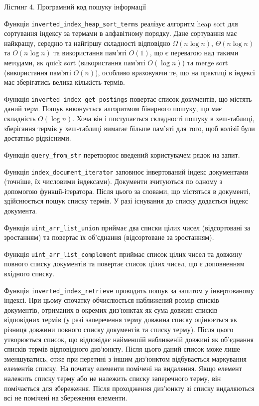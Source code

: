 \documentclass{../../templates/information_retrieval_lab}
\begin{document}
Лістинг 4. Програмний код пошуку інформації



Функція \texttt{inverted\_index\_heap\_sort\_terms} реалізує алгоритм heap sort для сортування індексу за термами в алфавітному порядку. Дане сортування має найкращу, середню та найгіршу складності відповідно $\Omega(n\log n)$, $\Theta(n\log n)$ та $O(n\log n)$ та використання пам'яті $O(1)$, що є перевагою над такими методами, як quick sort (використання пам'яті $O(\log n)$) та merge sort (використання пам'яті $O(n)$), особливо враховуючи те, що на практиці в індексі має зберігатись велика кількість термів.

Функція \texttt{inverted\_index\_get\_postings} повертає список документів, що містять даний терм. Пошук виконується алгоритмом бінарного пошуку, що має складність $O(\log n)$. Хоча він і поступається складності пошуку в хеш-таблиці, зберігання термів у хеш-таблиці вимагає більше пам'яті для того, щоб колізії були достатньо рідкісними.

Функція \texttt{query\_from\_str} перетворює введений користувачем рядок на запит.

Функція \texttt{index\_document\_iterator} заповнює інвертований індекс документами (точніше, їх числовими індексами). Документи зчитуються по одному з допомогою функції-ітератора. Після цього за словами, що містяться в документі, здійснюється пошук списку термів. У разі існування до списку додається індекс документа.

Функція \texttt{uint\_arr\_list\_union} приймає два списки цілих чисел (відсортовані за зростанням) та повертає їх об'єднання (відсортоване за зростанням).

Функція \texttt{uint\_arr\_list\_complement} приймає список цілих чисел та довжину повного списку документів та повертає список цілих чисел, що є доповненням вхідного списку.

Функція \texttt{inverted\_index\_retrieve} проводить пошук за запитом у інвертованому індексі. При цьому спочатку обчислюється наближений розмір списків документів, отриманих в окремих диз'юнктах як сума довжин списків відповідних термів (у разі заперечення терму довжина списку оцінюється як різниця довжини повного списку документів та списку терму). Після цього утворюється список, що відповідає найменшій наближеній довжині як об'єднання списків термів відповідного диз'юнкту. Після цього даний список може лише зменшуватись, отже при перетині з іншим диз'юнктом відбувається маркування елементів списку. На початку елементи помічені на видалення. Якщо елемент належить списку терму або не належить списку заперечного терму, він помічається для збереження. Після проходження диз'юнкту зі списку видаляються всі не помічені на збереження елементи.
\end{document}
